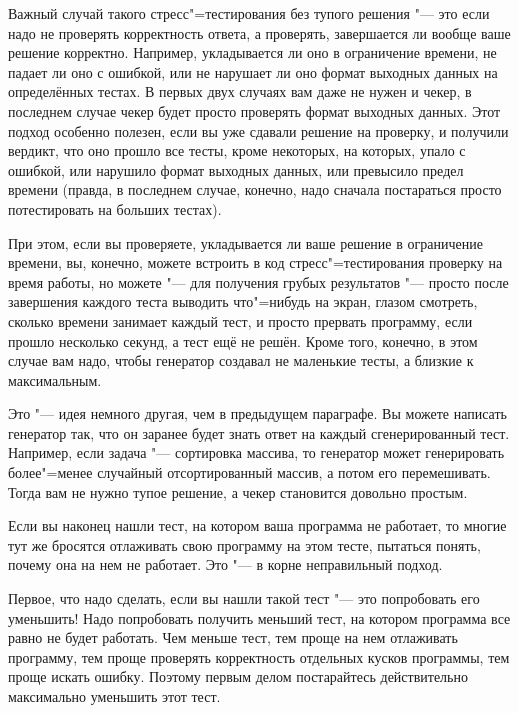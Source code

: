 Важный случай такого стресс"=тестирования без тупого решения "--- это если надо не проверять корректность ответа, а проверять, 
завершается ли вообще ваше решение корректно. 
Например, укладывается ли оно в ограничение времени, не падает ли оно с ошибкой, или не нарушает ли оно формат выходных данных на определённых тестах.
В первых двух случаях вам даже не нужен и чекер, в последнем случае чекер будет просто проверять формат выходных данных.
Этот подход особенно полезен, если вы уже сдавали решение на проверку, и получили вердикт, что оно прошло все тесты, кроме некоторых,
на которых, упало с ошибкой, или нарушило формат выходных данных, или превысило предел времени (правда, в последнем случае, конечно,
надо сначала постараться просто потестировать на больших тестах).

При этом, если вы проверяете, укладывается ли ваше решение в ограничение времени, вы, конечно, можете встроить в код стресс"=тестирования
проверку на время работы, но можете "--- для получения грубых результатов "--- просто после завершения каждого теста выводить что"=нибудь
на экран, глазом смотреть, сколько времени занимает каждый тест, и просто прервать программу, если прошло несколько секунд,
а тест ещё не решён. 
Кроме того, конечно, в этом случае вам надо, чтобы генератор создавал не маленькие тесты, а близкие к максимальным.

Это "--- идея немного другая, чем в предыдущем параграфе. 
Вы можете написать генератор так, что он заранее будет знать ответ на каждый сгенерированный тест. 
Например, если задача "--- сортировка массива, то генератор может генерировать более"=менее случайный отсортированный массив, 
а потом его перемешивать.
Тогда вам не нужно тупое решение, а чекер становится довольно простым.

Если вы наконец нашли тест, на котором ваша программа не работает, то многие тут же бросятся отлаживать свою программу на этом тесте, 
пытаться понять, почему она на нем не работает. Это "--- в корне неправильный подход.

Первое, что надо сделать, если вы нашли такой тест "--- это попробовать его уменьшить! 
Надо попробовать получить меньший тест, на котором программа все равно не будет работать. 
Чем меньше тест, тем проще на нем отлаживать программу, тем проще проверять корректность отдельных кусков программы, тем проще искать ошибку. 
Поэтому первым делом постарайтесь действительно максимально уменьшить этот тест.

